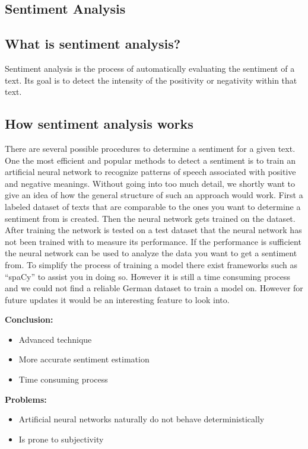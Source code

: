 \documentclass[
    fontsize=12pt,
    headings=small,
    parskip=half,           %
    bibliography=totoc,
    numbers=noenddot,       %
    open=any,               %
    ]{scrreprt}
\begin{document}
\subsection{Sentiment Analysis}

\subsection*{What is sentiment analysis?}

Sentiment analysis is the process of automatically evaluating the sentiment of a text. Its goal is to detect the intensity of the positivity or negativity within that text.


\subsection*{How sentiment analysis works}
There are several possible procedures to determine a sentiment for a given text. One the most efficient and popular methods to detect a sentiment is to train an artificial neural network to recognize patterns of speech associated with positive and negative meanings. Without going into too much detail, we shortly want to give an idea of how the general structure of such an approach would work. First a labeled dataset of texts that are comparable to the ones you want to determine a sentiment from is created. Then the neural network gets trained on the dataset. After training the network is tested on a test dataset that the neural network has not been trained with to measure its performance. If the performance is sufficient the neural network can be used to analyze the data you want to get a sentiment from. To simplify the process of training a model there exist frameworks such as “spaCy” to assist you in doing so. However it is still a time consuming process and we could not find a reliable German dataset to train a model on. However for future updates it would be an interesting feature to look into.

\textbf{Conclusion:}
\begin{itemize}
    \item Advanced technique
    \item More accurate sentiment estimation
    \item Time consuming process
\end{itemize}

\textbf{Problems:}
\begin{itemize}
    \item Artificial neural networks naturally do not behave deterministically
    \item Is prone to subjectivity
\end{itemize}
\end{document}
